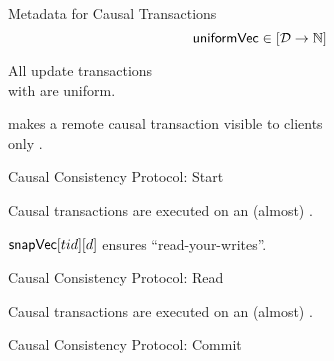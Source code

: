 \begin{frame}{Metadata for Causal Transactions}
  \[
    {\sf uniformVec} \in [\mathcal{D} \to \mathbb{N}]
  \]

  \begin{lemma}
    \begin{center}
      All update transactions \\[3pt]
      with  are uniform.
    \end{center}
  \end{lemma}

  \pause
  \vspace{0.30cm}
  \begin{center}
    \unistore{} makes a remote causal transaction visible to clients \\[3pt]
    only .
  \end{center}
\end{frame}

\begin{frame}{Causal Consistency Protocol: Start}
  \begin{center}
    Causal transactions are executed on an (almost) .

    \vspace{0.20cm}

    ${\sf snapVec}[tid][d]$ ensures ``{read-your-writes}''.
  \end{center}
\end{frame}


\begin{frame}{Causal Consistency Protocol: Read}
  \begin{center}
    Causal transactions are executed on an (almost) .

  \end{center}
\end{frame}

\begin{frame}{Causal Consistency Protocol: Commit}
  \begin{center}

  \end{center}
\end{frame}
